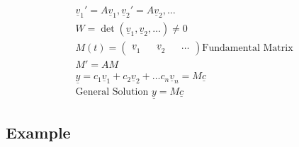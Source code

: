 \documentclass[fleqn]{report}
\newcommand{\equations} [1] {
\begin{gather*}
#1
\end{gather*}
}
\begin{document}
\equations{
\underline v_1 ' = A \underline v_1 , \underline v_2 ' = A \underline v_2 , \ldots 
\\
W = \det (\underline v_1, \underline v_2, \ldots) \neq 0
\\
M(t) = \begin{pmatrix} \underline v_1 && \underline v_2 && \ldots \end{pmatrix} 
\textrm{Fundamental Matrix}
\\
M' = AM
\\
\underline y = c_1 \underline v_1 + c_2 \underline v_2 + \ldots c_n \underline v_n = M \underline c
\\
\textrm{General Solution } \underline y = M \underline c
}

\subsection{Example}
\end{document}
